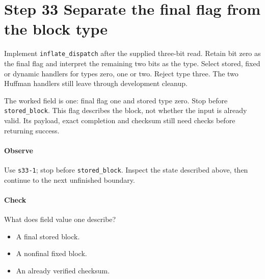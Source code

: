 \section{Step 33 Separate the final flag from the block type}\label{png-inflate-s33}
Implement \texttt{inflate\_dispatch} after the supplied three-bit read. Retain bit zero as the final flag and interpret the remaining two bits as the type. Select stored, fixed or dynamic handlers for types zero, one or two. Reject type three. The two Huffman handlers still leave through development cleanup.

The worked field is one: final flag one and stored type zero. Stop before \texttt{stored\_block}. This flag describes the block, not whether the input is already valid. Its payload, exact completion and checksum still need checks before returning success.

\paragraph{Observe} Use \texttt{s33-1}; stop before \texttt{stored\_block}. Inspect the state described above, then continue to the next unfinished boundary.

\paragraph{Check} What does field value one describe?
\begin{itemize}
\item[A.] A final stored block.
\item[B.] A nonfinal fixed block.
\item[C.] An already verified checksum.
\end{itemize}
